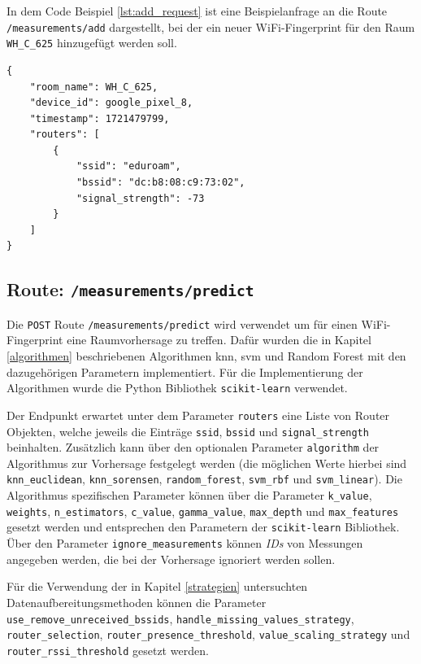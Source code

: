 In dem Code Beispiel \ref{lst:add_request} ist eine Beispielanfrage an die Route \texttt{/measurements/add} dargestellt, bei der ein neuer WiFi-Fingerprint für den Raum \texttt{WH\_C\_625} hinzugefügt werden soll.

\begin{lstlisting}[caption={Beispiel für eine Anfrage an \texttt{/measurements/predict}}, label={lst:add_request}]
{
    "room_name": WH_C_625,
    "device_id": google_pixel_8,
    "timestamp": 1721479799,
    "routers": [
        {
            "ssid": "eduroam",
            "bssid": "dc:b8:08:c9:73:02",
            "signal_strength": -73
        }
    ]
}
\end{lstlisting}

\subsection*{Route: \texttt{/measurements/predict}}

Die \texttt{POST} Route \texttt{/measurements/predict} wird verwendet um für einen WiFi-Fingerprint eine Raumvorhersage zu treffen. Dafür wurden die in Kapitel \ref{algorithmen} beschriebenen Algorithmen \gls{knn}, \gls{svm} und Random Forest mit den dazugehörigen Parametern implementiert. Für die Implementierung der Algorithmen wurde die Python Bibliothek \texttt{scikit-learn} verwendet.

Der Endpunkt erwartet unter dem Parameter \texttt{routers} eine Liste von Router Objekten, welche jeweils die Einträge \texttt{ssid}, \texttt{bssid} und \texttt{signal\_strength} beinhalten. Zusätzlich kann über den optionalen Parameter \texttt{algorithm} der Algorithmus zur Vorhersage festgelegt werden (die möglichen Werte hierbei sind \texttt{knn\_euclidean}, \texttt{knn\_sorensen}, \texttt{random\_forest}, \texttt{svm\_rbf} und \texttt{svm\_linear}). Die Algorithmus spezifischen Parameter können über die Parameter \texttt{k\_value}, \texttt{weights}, \texttt{n\_estimators}, \texttt{c\_value}, \texttt{gamma\_value}, \texttt{max\_depth} und \texttt{max\_features} gesetzt werden und entsprechen den Parametern der \texttt{scikit-learn} Bibliothek. Über den Parameter \texttt{ignore\allowbreak\_\allowbreak measurements} können \textit{IDs} von Messungen angegeben werden, die bei der Vorhersage ignoriert werden sollen.

Für die Verwendung der in Kapitel \ref{strategien} untersuchten Datenaufbereitungsmethoden können die Parameter \texttt{use\allowbreak\_remove\allowbreak\_unreceived\allowbreak\_bssids}, \texttt{handle\allowbreak\_missing\allowbreak\_values\allowbreak\_strategy}, \texttt{router\allowbreak\_selection}, \texttt{router\allowbreak\_presence\allowbreak\_threshold}, \texttt{value\allowbreak\_scaling\allowbreak\_strategy} und \texttt{router\allowbreak\_rssi\allowbreak\_thres\-hold} gesetzt werden.

